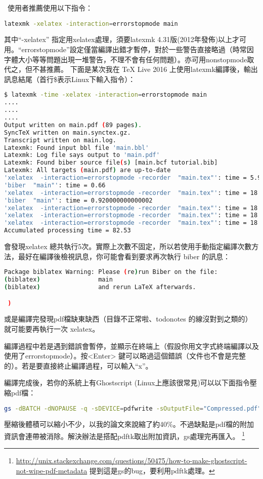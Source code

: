 \documentclass[class=NCU_thesis, crop=false, float=true]{standalone}
\begin{document}
\XeLaTeX\ 使用者推薦使用以下指令：\\
\begin{lstlisting}[style=consoleStyle,language=bash]
latexmk -xelatex -interaction=errorstopmode main
\end{lstlisting}
其中``-xelatex'' 指定用xelatex處理，須要latexmk 4.31版(2012年發佈)以上才可用。``errorstopmode''設定僅當編譯出錯才暫停，對於一些警告直接略過（時常因字體大小等等問題出現一堆警告，不理不會有任何問題）。亦可用nonstopmode取代之，但不甚推薦。
下面是某次我在 TeX Live 2016 上使用latexmk編譯後，輸出訊息結尾（首行\$表示Linux下輸入指令）：
\begin{lstlisting}[style=consoleStyle,language=bash]
$ latexmk -time -xelatex -interaction=errorstopmode main
....
....
....
Output written on main.pdf (89 pages).
SyncTeX written on main.synctex.gz.
Transcript written on main.log.
Latexmk: Found input bbl file 'main.bbl'
Latexmk: Log file says output to 'main.pdf'
Latexmk: Found biber source file(s) [main.bcf tutorial.bib]
Latexmk: All targets (main.pdf) are up-to-date
'xelatex  -interaction=errorstopmode -recorder  "main.tex"': time = 5.92
'biber  "main"': time = 0.66
'xelatex  -interaction=errorstopmode -recorder  "main.tex"': time = 18.36
'biber  "main"': time = 0.920000000000002
'xelatex  -interaction=errorstopmode -recorder  "main.tex"': time = 18.01
'xelatex  -interaction=errorstopmode -recorder  "main.tex"': time = 18.2
'xelatex  -interaction=errorstopmode -recorder  "main.tex"': time = 18.09
Accumulated processing time = 82.53
\end{lstlisting}
會發現xelatex 總共執行5次。實際上次數不固定，所以若使用手動指定編譯次數方法，最好在編譯後檢視訊息，你可能會看到要求再次執行 biber 的訊息：
\begin{lstlisting}[style=consoleStyle,language=bash]
Package biblatex Warning: Please (re)run Biber on the file:
(biblatex)                main
(biblatex)                and rerun LaTeX afterwards.

 )
\end{lstlisting}
或是編譯完發現pdf檔缺東缺西（目錄不正常啦、todonotes 的線沒對到之類的）就可能要再執行一次 xelatex。

編譯過程中若是遇到錯誤會暫停，並顯示在終端上（假設你用文字式終端編譯以及使用了errorstopmode）。按<Enter> 鍵可以略過這個錯誤（文件也不會是完整的）。若是要直接終止編譯過程，可以輸入``x''。

編譯完成後，若你的系統上有Ghostscript (Linux上應該很常見)可以以下面指令壓縮pdf檔：
\begin{lstlisting}[style=consoleStyle,language=bash]
gs -dBATCH -dNOPAUSE -q -sDEVICE=pdfwrite -sOutputFile="Compressed.pdf" "Original.pdf"
\end{lstlisting}
壓縮後體積可以縮小不少，以我的論文來說縮了約40\%。不過缺點是pdf檔的附加資訊會連帶被消除。解決辦法是搭配pdftk取出附加資訊，gs處理完再匯入。
\footnote{\url{http://unix.stackexchange.com/questions/50475/how-to-make-ghostscript-not-wipe-pdf-metadata} 提到這是gs的bug，要利用pdftk處理。}
\end{document}
